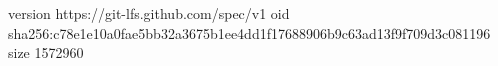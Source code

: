version https://git-lfs.github.com/spec/v1
oid sha256:c78e1e10a0fae5bb32a3675b1ee4dd1f17688906b9c63ad13f9f709d3c081196
size 1572960
